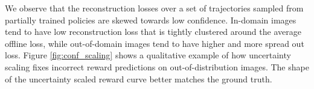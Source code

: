 We observe that the reconstruction losses over a set of trajectories sampled from partially trained policies are skewed towards low confidence. In-domain images tend to have low reconstruction loss that is tightly clustered around the average offline loss, while out-of-domain images tend to have higher and more spread out loss. Figure \ref{fig:conf_scaling} shows a qualitative example of how uncertainty scaling fixes incorrect reward predictions on out-of-distribution images. The shape of the uncertainty scaled reward curve better matches the ground truth.




